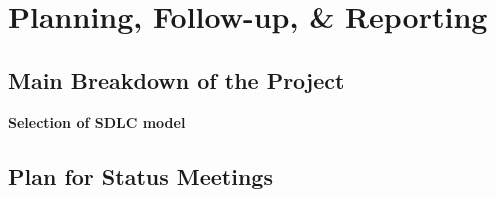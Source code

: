 \section{Planning, Follow-up, \& Reporting}
\subsection{Main Breakdown of the Project}

\textbf{Selection of SDLC model}
\subsection{Plan for Status Meetings}
